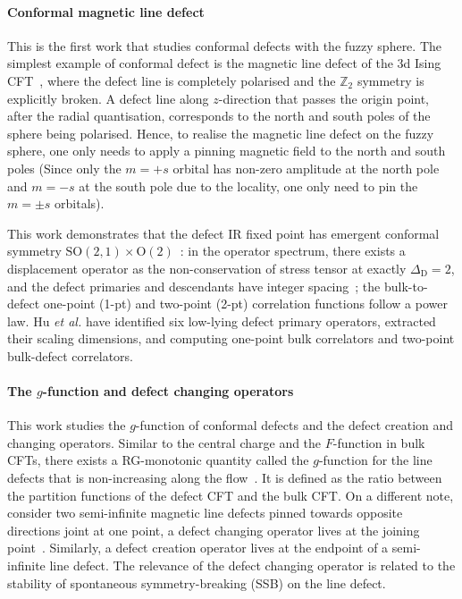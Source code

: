 \documentclass{timesjhep}
\begin{document}
\paragraph{Conformal magnetic line defect~\cite{Hu2023Aug}}

This is the first work that studies conformal defects with the fuzzy sphere. The simplest example of conformal defect is the magnetic line defect of the 3d Ising CFT~\cite{Andreas2000MagLine,Allais2014MagLine,Allais2013MagLine,Pannell2023MagLine}, where the defect line is completely polarised and the $\mathbb{Z}_2$ symmetry is explicitly broken. A defect line along $z$-direction that passes the origin point, after the radial quantisation, corresponds to the north and south poles of the sphere being polarised. Hence, to realise the magnetic line defect on the fuzzy sphere, one only needs to apply a pinning magnetic field to the north and south poles (Since only the $m=+s$ orbital has non-zero amplitude at the north pole and $m=-s$ at the south pole due to the locality, one only need to pin the $m=\pm s$ orbitals). 

This work demonstrates that the defect IR fixed point has emergent conformal symmetry $\mathrm{SO}(2,1)\times\mathrm{O}(2)$~: in the operator spectrum, there exists a displacement operator as the non-conservation of stress tensor at exactly $\Delta_\mathrm{D}=2$, and the defect primaries and descendants have integer spacing~; the bulk-to-defect one-point (1-pt) and two-point (2-pt) correlation functions follow a power law. Hu \textit{et al.} have identified six low-lying defect primary operators, extracted their scaling dimensions, and computing one-point bulk correlators and two-point bulk-defect correlators. 

\paragraph{The $g$-function and defect changing operators~\cite{Zhou2024Jan}}

This work studies the $g$-function of conformal defects and the defect creation and changing operators. Similar to the central charge and the $F$-function in bulk CFTs, there exists a RG-monotonic quantity called the $g$-function for the line defects that is non-increasing along the flow~\cite{Cuomo2021gfn,Casini2022gfn}. It is defined as the ratio between the partition functions of the defect CFT and the bulk CFT. On a different note, consider two semi-infinite magnetic line defects pinned towards opposite directions joint at one point, a defect changing operator lives at the joining point~\cite{Affleck1994DefCh,Affleck1996DefCh}. Similarly, a defect creation operator lives at the endpoint of a semi-infinite line defect. The relevance of the defect changing operator is related to the stability of spontaneous symmetry-breaking (SSB) on the line defect. 
\end{document}
